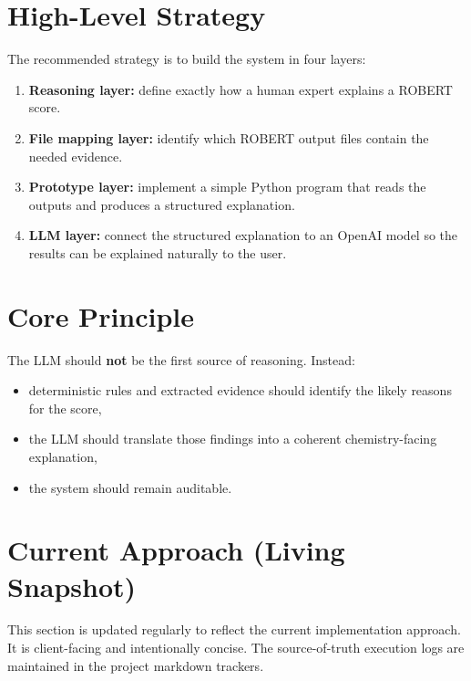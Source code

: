 \documentclass[11pt]{article}
\begin{document}
\section{High-Level Strategy}
The recommended strategy is to build the system in four layers:

\begin{enumerate}
    \item \textbf{Reasoning layer:} define exactly how a human expert explains a ROBERT score.
    \item \textbf{File mapping layer:} identify which ROBERT output files contain the needed evidence.
    \item \textbf{Prototype layer:} implement a simple Python program that reads the outputs and produces a structured explanation.
    \item \textbf{LLM layer:} connect the structured explanation to an OpenAI model so the results can be explained naturally to the user.
\end{enumerate}

\section{Core Principle}
The LLM should \textbf{not} be the first source of reasoning. Instead:

\begin{itemize}
    \item deterministic rules and extracted evidence should identify the likely reasons for the score,
    \item the LLM should translate those findings into a coherent chemistry-facing explanation,
    \item the system should remain auditable.
\end{itemize}

\section{Current Approach (Living Snapshot)}
This section is updated regularly to reflect the current implementation approach.
It is client-facing and intentionally concise. The source-of-truth execution logs
are maintained in the project markdown trackers.
\end{document}
